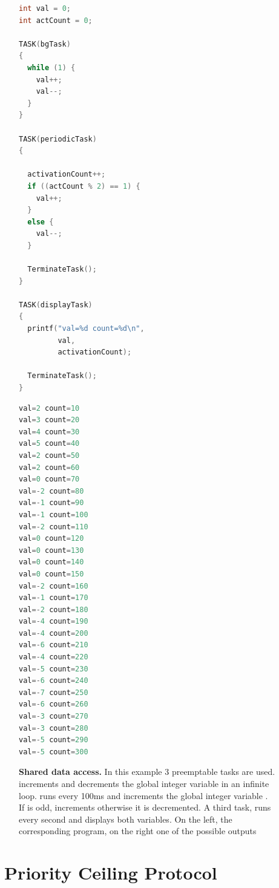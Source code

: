 \begin{figure}[htbp] %
   \centering
   \begin{minipage}[c]{.55\linewidth}
\begin{lstlisting}[language=C]
int val = 0;
int actCount = 0;

TASK(bgTask)
{
  while (1) {
    val++;
    val--;
  }
}

TASK(periodicTask)
{

  activationCount++;
  if ((actCount % 2) == 1) {
    val++;
  }
  else {
    val--;
  }
    
  TerminateTask();
}

TASK(displayTask)
{
  printf("val=%d count=%d\n",
         val,
         activationCount);
    
  TerminateTask();
}
\end{lstlisting}
   \end{minipage}\hfill
   \begin{minipage}[c]{.35\linewidth}
\begin{lstlisting}[language=C]
val=2 count=10
val=3 count=20
val=4 count=30
val=5 count=40
val=2 count=50
val=2 count=60
val=0 count=70
val=-2 count=80
val=-1 count=90
val=-1 count=100
val=-2 count=110
val=0 count=120
val=0 count=130
val=0 count=140
val=0 count=150
val=-2 count=160
val=-1 count=170
val=-2 count=180
val=-4 count=190
val=-4 count=200
val=-6 count=210
val=-4 count=220
val=-5 count=230
val=-6 count=240
val=-7 count=250
val=-6 count=260
val=-3 count=270
val=-3 count=280
val=-5 count=290
val=-5 count=300
\end{lstlisting}
   \end{minipage}
   \caption{{\bfseries Shared data access.} In this example 3 preemptable tasks are used.  increments and decrements the global integer variable  in an infinite loop.  runs every 100ms and increments the global integer variable . If  is odd,  increments  otherwise it is decremented. A third task,  runs every second and displays both variables. On the left, the corresponding program, on the right one of the possible outputs}
   \label{fig:exampleRaceCondition}
\end{figure}

\section{\osek\ Priority Ceiling Protocol}

